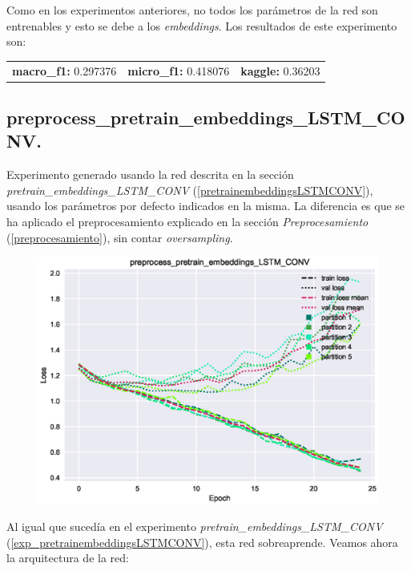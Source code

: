 \documentclass[11pt]{article}
\begin{document}
Como en los experimentos anteriores, no todos los parámetros de la red son entrenables y esto se debe a los \textit{embeddings}. Los resultados de este experimento son: 

\begin{table}[H]
\begin{tabular}{c|c|c}
\textbf{macro\_f1:} 0.297376 & \textbf{micro\_f1:} 0.418076 & \textbf{kaggle:} 0.36203
\end{tabular}
\end{table}

\subsection{preprocess\_pretrain\_embeddings\_LSTM\_CONV.} \label{exp_preprocesspretrainembeddingsLSTMCONV}

Experimento generado usando la red descrita en la sección \textit{pretrain\_embeddings\_LSTM\_CONV} (\ref{pretrainembeddingsLSTMCONV}), usando los parámetros por defecto indicados en la misma. La diferencia es que se ha aplicado el preprocesamiento explicado en la sección \textit{Preprocesamiento} (\ref{preprocesamiento}), sin contar \textit{oversampling}.

\begin{figure}[H]
\includegraphics[width=\linewidth]{images/loss/preprocess_pretrain_embeddings_LSTM_CONV-1554207722.eps}
\end{figure}

Al igual que sucedía en el experimento \textit{pretrain\_embeddings\_LSTM\_CONV} (\ref{exp_pretrainembeddingsLSTMCONV}), esta red sobreaprende. Veamos ahora la arquitectura de la red:
\end{document}
